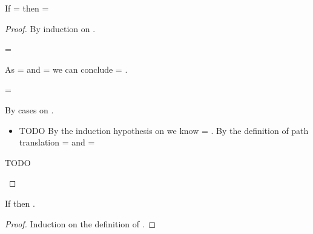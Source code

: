 \begin{lemma} \label{lemma:pathindependent}
  If \inopenvnoeq{\openv{}}{\object{}} = 
  then \inopenvnoeq{\openv{}}{\path{\pathelem{}}{\object{}}} =
 \begin{proof}
   By induction on \pathelem{}.
   \begin{case}[\pathelem{} = \emptypath{}]
     \inopenvnoeq{\openv{}}{\object{}} = {\inopenvnoeq{\openv{}}{\objectp{}}}

     As 
     \inopenvnoeq{\openv{}}{\path{\emptypath{}}{\object{}}} = \inopenvnoeq{\openv{}}{\object{}}
     and
     \inopenvnoeq{\openv{}}{\path{\emptypath{}}{\objectp{}}} = \inopenvnoeq{\openv{}}{\objectp{}}
     we can conclude 
     \inopenvnoeq{\openv{}}{\path{\emptypath{}}{\object{}}} = \inopenvnoeq{\openv{}}{\path{\emptypath{}}{\objectp{}}}.
   \end{case}
   \begin{case}[\pathelem{} = {\destructpath{\pesyntax{}}{\pathelem{1}}}]
     \inopenvnoeq{\openv{}}{\object{}} = {\inopenvnoeq{\openv{}}{\objectp{}}}

     By cases on \pesyntax{}.

     \begin{itemize}
       \item[]
   \begin{subcase}[\pesyntax{} = {\keype{\k{}}}] 

     TODO
     By the induction hypothesis on {}
     we know {} =
             {}.
             By the definition of path translation 
             {} = {\getexp {{\openv{}}(\object{})}{\k{}}}
             and 
             {} = {\getexp {{\openv{}}(\objectp{})}{\k{}}}
   \end{subcase} 
     \end{itemize}
     TODO
   \end{case}
 \end{proof}
\end{lemma}

\begin{lemma}[\classconst]\label{lemma:classconst}
  If
  {\opsem{\openv{}}{\appexp{\classconst{}}{\openv{}({\path{\pathelem{}}{\x{}}})}}{\class{}}} then
  {\satisfies{\openv{}}{\isprop{\class{}}{\path{\pathelem{}}{\x{}}}}}.

  \begin{proof}
    Induction on the definition of {\classconst{}}.
  \end{proof}
\end{lemma}

